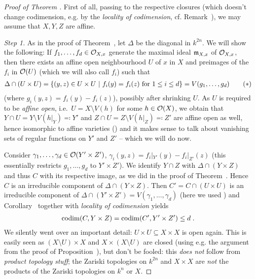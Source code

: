 \documentclass[a4paper,parskip=half,numbers=enddot, DIV=12, headheight=30pt]{scrreprt}
\begin{document}
\begin{proof}[Proof of Theorem ]
	First of all, passing to the respective closures (which doesn't change codimension, e.g. by the \emph{locality of codimension}, cf. Remark~), we may assume that $X,Y,Z$ are affine.
	
    \emph{Step 1.} As in the proof of Theorem~, let $\Delta$ be the diagonal in $k^{2n}$. We will show the following: If $f_1,\ldots, f_d\in\mathcal{O}_{X,x}$ generate the maximal ideal $\mathfrak{m}_{X,x}$ of $\mathcal{O}_{X,x}$, then there exists an affine open neighbourhood $U$ of $x$ in $X$ and preimages of the $f_i$ in $\mathcal{O}(U)$ (which we will also call $f_i$) such that 
    \begin{align}\lbl{eq:conditionOnUxU}
        \Delta \cap (U\times U) = \left\{(y,z)\in U\times U \st f_i(y) = f_i(z) \text{ for } 1\leq i \leq d\right\}= V(g_1,\ldots,g_d)\tag{$*$}
    \end{align}
    (where $g_i(y,z)=f_i(y)-f_i(z)$), possibly after shrinking $U$. As $U$ is required to be \emph{affine open}, i.e.\ $U=X\setminus V(h)$ for some $h\in\mathcal{O}(X)$, we obtain that $Y\cap U=Y\setminus V(h|_Y)\eqqcolon Y'$ and $Z\cap U=Z\setminus V(h|_Z)\eqqcolon Z'$ are affine open as well, hence isomorphic to affine varieties (\cite[Proposition~2.2.4]{alg1}) and it makes sense to talk about vanishing sets of regular functions on $Y'$ and $Z'$ -- which we will do now. 
    
    Consider $\gamma_1,\ldots, \gamma_d\in\mathcal{O}(Y'\times Z')$, $\gamma_i(y,z)=f_i|_{Y'}(y)-f_i|_{Z'}(z)$ (this essentially restricts $g_1,\ldots, g_d$ to $Y'\times Z'$). We identify $Y\cap Z$ with $\Delta\cap (Y\times Z)$ and thus $C$ with its respective image, as we did in the proof of Theorem~. Hence $C$ is an irreducible component of $\Delta\cap (Y\times Z)$. Then $C'=C\cap (U\times U)$ is an irreducible component of $\Delta\cap (Y'\times Z')=V(\gamma_1,\ldots,\gamma_d)$ (here we used ) and Corollary~ together with \emph{locality of codimension} yields
    \begin{align*}
    	\operatorname{codim}(C,Y\times Z)=\operatorname{codim}(C',Y'\times Z')\leq d\;.
    \end{align*}
    We silently went over an important detail: $U\times U\subseteq X\times X$ is open again. This is easily seen as $(X\setminus U)\times X$ and $X\times (X\setminus U)$ are closed (using e.g. the argument from the proof of Proposition~), but don't be fooled: this \emph{does not} follow from \emph{product topology stuff}; the Zariski topologies on $k^{2n}$ and $X\times X$ are \emph{not} the products of the Zariski topologies on $k^n$ or $X$. 
    

\end{proof}
\end{document}
